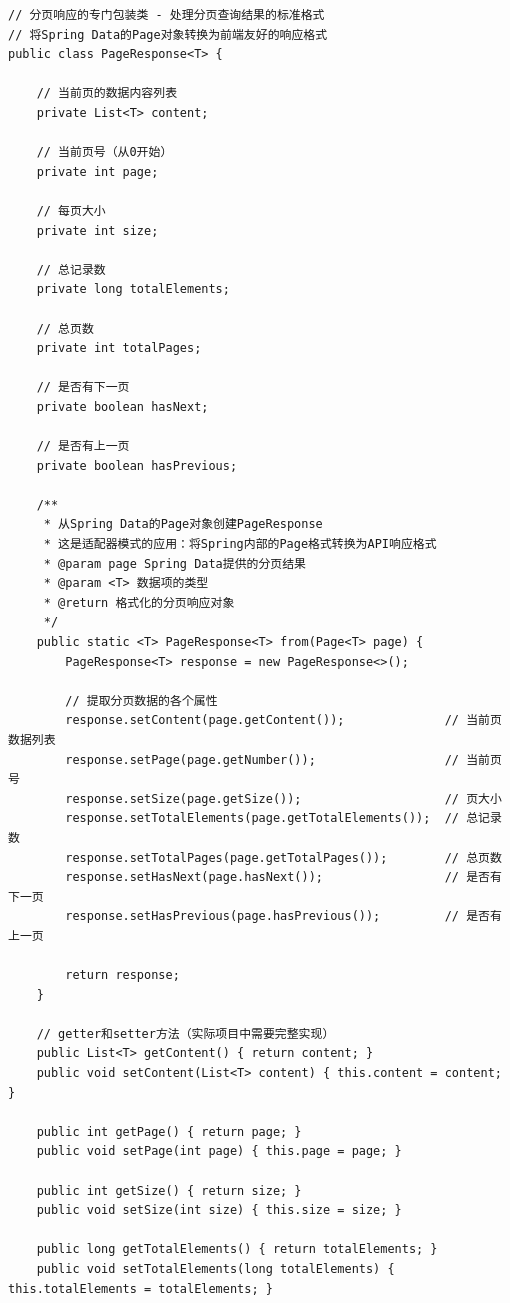 \begin{verbatim}
// 分页响应的专门包装类 - 处理分页查询结果的标准格式
// 将Spring Data的Page对象转换为前端友好的响应格式
public class PageResponse<T> {
    
    // 当前页的数据内容列表
    private List<T> content;
    
    // 当前页号（从0开始）
    private int page;
    
    // 每页大小
    private int size;
    
    // 总记录数
    private long totalElements;
    
    // 总页数
    private int totalPages;
    
    // 是否有下一页
    private boolean hasNext;
    
    // 是否有上一页
    private boolean hasPrevious;
    
    /**
     * 从Spring Data的Page对象创建PageResponse
     * 这是适配器模式的应用：将Spring内部的Page格式转换为API响应格式
     * @param page Spring Data提供的分页结果
     * @param <T> 数据项的类型
     * @return 格式化的分页响应对象
     */
    public static <T> PageResponse<T> from(Page<T> page) {
        PageResponse<T> response = new PageResponse<>();
        
        // 提取分页数据的各个属性
        response.setContent(page.getContent());              // 当前页数据列表
        response.setPage(page.getNumber());                  // 当前页号
        response.setSize(page.getSize());                    // 页大小
        response.setTotalElements(page.getTotalElements());  // 总记录数
        response.setTotalPages(page.getTotalPages());        // 总页数
        response.setHasNext(page.hasNext());                 // 是否有下一页
        response.setHasPrevious(page.hasPrevious());         // 是否有上一页
        
        return response;
    }
    
    // getter和setter方法（实际项目中需要完整实现）
    public List<T> getContent() { return content; }
    public void setContent(List<T> content) { this.content = content; }
    
    public int getPage() { return page; }
    public void setPage(int page) { this.page = page; }
    
    public int getSize() { return size; }
    public void setSize(int size) { this.size = size; }
    
    public long getTotalElements() { return totalElements; }
    public void setTotalElements(long totalElements) { this.totalElements = totalElements; }
    

\end{verbatim}
